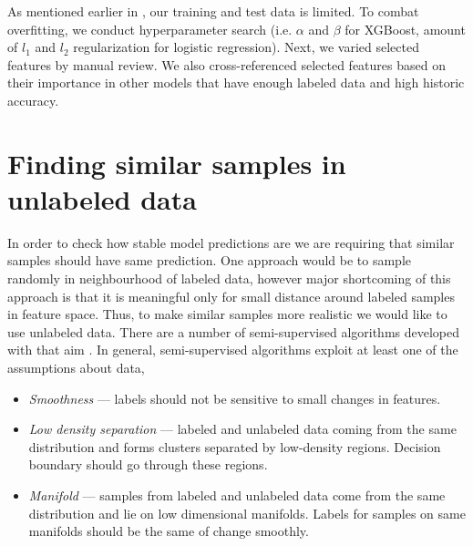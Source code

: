 \documentclass{article}
\begin{document}
As mentioned earlier in , our training and test data is limited. To combat overfitting, we conduct hyperparameter search (i.e. $\alpha$ and $\beta$ for XGBoost, amount of $l_1$ and $l_2$ regularization for logistic regression). Next, we varied selected features by manual review. We also cross-referenced selected features based on their importance in other models that have enough labeled data and high historic accuracy.

\section{Finding similar samples in unlabeled data}
\label{sec:unlabeled}

In order to check how stable model predictions are we are requiring that similar samples should have same prediction. One approach would be to sample randomly in neighbourhood of labeled data, however major shortcoming of this approach is that it is meaningful only for small distance around labeled samples in feature space. Thus, to make similar samples more realistic we would like to use unlabeled data. There are a number of semi-supervised algorithms developed with that aim \cite{semi-fuzzy, semi-cluster, semi-post-label}. In general, semi-supervised algorithms exploit at least one of the assumptions about data, 

\begin{itemize}
    \item \textit{Smoothness} --- labels should not be sensitive to small changes in features.
    \item \textit{Low density separation} --- labeled and unlabeled data coming from the same distribution and forms clusters separated by low-density regions. Decision boundary should go through these regions.
    \item \textit{Manifold} --- samples from labeled and unlabeled data come from the same distribution and lie on low dimensional manifolds. Labels for samples on same manifolds should be the same of change smoothly.
\end{itemize}
\end{document}
